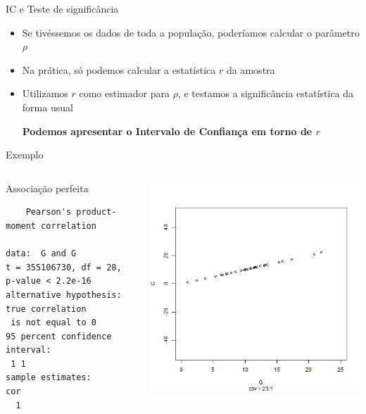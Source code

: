 \documentclass{beamer}
\begin{document}
\begin{frame}{\scriptsize IC e Teste de significância}
  \begin{itemize}
    \footnotesize
  \item Se tivéssemos os dados de toda a \alert<1>{população}, poderíamos
    calcular o \alert<1>{parâmetro} $\rho$
      \bigskip
  \item Na prática, só podemos calcular a \alert<2>{estatística} $r$ da \alert<2>{amostra}
      \bigskip
  \item Utilizamos $r$ como estimador para $\rho$, e testamos a
    significância estatística da forma usual

    {\scriptsize \bf Podemos apresentar o Intervalo de Confiança em torno de $r$}
  \end{itemize}
\end{frame}

\begin{frame}[fragile]{\scriptsize Exemplo}
  \begin{columns}
    \begin{column}{6cm}
      \begin{exampleblock}{Associação perfeita}
        \tiny
\begin{verbatim}
	Pearson's product-moment correlation

data:  G and G
t = 355106730, df = 28, p-value < 2.2e-16
alternative hypothesis: true correlation
 is not equal to 0
95 percent confidence interval:
 1 1
sample estimates:
cor 
  1
\end{verbatim}
      \end{exampleblock}
\end{column}
    \begin{column}{4cm}
      \begin{center}
        \includegraphics[height=.8\textheight]{Cap17/anim-0}
      \end{center}
    \end{column}
\end{columns}
\end{frame}
\end{document}
